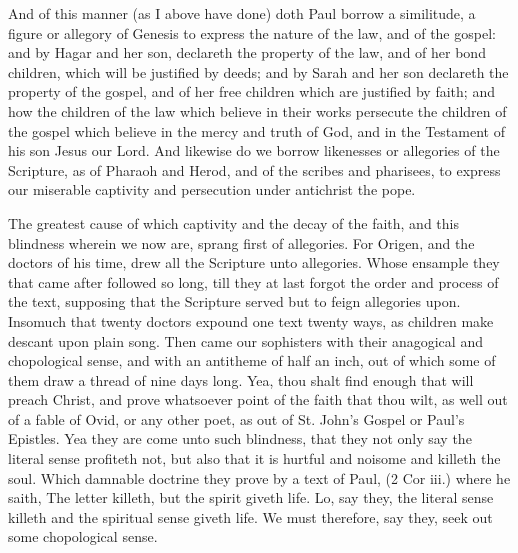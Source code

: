 And of this manner (as I above have done) doth Paul 
borrow a similitude, a figure or allegory of Genesis to 
express the nature of the law, and of the gospel: and by 
Hagar and her son, declareth the property of the law, and
of her bond children, which will be justified by deeds;
and by Sarah and her son declareth the property of the 
gospel, and of her free children which are justified by faith; 
and how the children of the law which believe in their 
works persecute the children of the gospel which believe 
in the mercy and truth of God, and in the Testament of 
his son Jesus our Lord. And likewise do we borrow 
likenesses or allegories of the Scripture, as of Pharaoh 
and Herod, and of the scribes and pharisees, to express our 
miserable captivity and persecution under antichrist the pope. 

The greatest cause of which captivity and the decay of 
the faith, and this blindness wherein we now are, sprang
first of allegories. For Origen, and the doctors of his
time, drew all the Scripture unto allegories. Whose ensample
they that came after followed so long, till they at 
last forgot the order and process of the text, supposing 
that the Scripture served but to feign allegories upon. Insomuch
that twenty doctors expound one text twenty ways, 
as children make descant upon plain song. Then came 
our sophisters with their anagogical and chopological sense, 
and with an antitheme of half an inch, out of which some 
of them draw a thread of nine days long. Yea, thou shalt 
find enough that will preach Christ, and prove whatsoever 
point of the faith that thou wilt, as well out of a fable of 
Ovid, or any other poet, as out of St. John's Gospel or 
Paul's Epistles. Yea they are come unto such blindness, 
that they not only say the literal sense profiteth not, but 
also that it is hurtful and noisome and killeth the soul. 
Which damnable doctrine they prove by a text of Paul, 
(2 Cor iii.) where he saith, The letter killeth, but the 
spirit giveth life. Lo, say they, the literal sense killeth 
and the spiritual sense giveth life. We must therefore, 
say they, seek out some chopological sense. 

